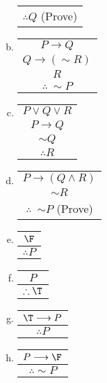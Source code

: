 \begin{multicols}{2}
\begin{enumerate}
\begin{enumerate}[(a)]
\begin{tabular}{c}
                        $\therefore Q$ (Prove)
      \end{tabular}\bigskip
\item \begin{tabular}{c}$P\longrightarrow Q$\\$Q\longrightarrow(\sim R)$\\
                        $R$\\\hline$\therefore\ \sim P$
      \end{tabular}\bigskip
\item \begin{tabular}{c}$P\vee Q\vee R$\\$P\longrightarrow Q$\\$\sim Q$\\
                        \hline$\therefore R$
       \end{tabular}\bigskip

\item \begin{tabular}{c}$P\longrightarrow(Q\wedge R)$\\
                        $\sim R$\\
                        \hline
                        $\therefore$\ $\sim P$ (Prove)
       \end{tabular}
\item \begin{tabular}{c}$\F$\\ \hline$\therefore P$\end{tabular}
\item \begin{tabular}{c}$P$\\ \hline $\therefore \T$\end{tabular}
\item \begin{tabular}{c}$\T\longrightarrow P$\\ 
\hline $\therefore P$\end{tabular}
\item \begin{tabular}{c}$P\longrightarrow \F$\\ \hline$\therefore \sim P$
\end{tabular}
\end{enumerate}
\end{enumerate}
\end{multicols}
\newpage
 

